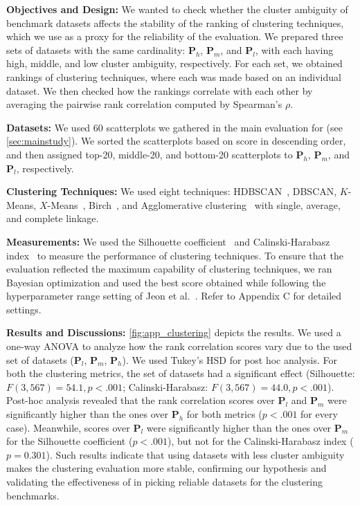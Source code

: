 \noindent
\textbf{Objectives and Design:}
We wanted to check whether the cluster ambiguity of benchmark datasets affects the stability of the ranking of clustering techniques, which we use as a proxy for the reliability of the evaluation. 
We prepared three sets of datasets with the same cardinality: $\mathbf{P}_h$, $\mathbf{P}_m$, and $\mathbf{P}_l$, with each having high, middle, and low cluster ambiguity, respectively. 
For each set, we obtained rankings of clustering techniques, where each was made based on an individual dataset. We then checked how the rankings correlate with each other by averaging the pairwise rank correlation computed by Spearman's $\rho$.

\noindent
\textbf{Datasets:}
We used 60 scatterplots we gathered in the main evaluation for \measure (see \autoref{sec:mainstudy}). We sorted the scatterplots based on \measure score in descending order, and then assigned top-20, middle-20, and bottom-20 scatterplots to $\mathbf{P}_h$, $\mathbf{P}_m$, and $\mathbf{P}_l$, respectively.  

\noindent
\textbf{Clustering Techniques:}
We used eight techniques: HDBSCAN~\cite{campello13kdd}, DBSCAN, $K$-Means, $X$-Means~\cite{pelleg00icml}, Birch~\cite{zhang96sigmod}, and Agglomerative clustering~\cite{mullner11arxiv} with single, average, and complete linkage.

\noindent
\textbf{Measurements:}
We used the Silhouette coefficient~\cite{rousseeuw87jcam} and Calinski-Harabasz index~\cite{calinski74cis} to measure the performance of clustering techniques. To ensure that the evaluation reflected the maximum capability of clustering techniques, we ran Bayesian optimization and used the best score obtained while following the hyperparameter range setting of Jeon et al.~\cite{jeon22arxiv}.
Refer to Appendix C for detailed settings.


\noindent
\textbf{Results and Discussions:}
\autoref{fig:app_clustering} depicts the results.
We used a one-way ANOVA to analyze how the rank correlation scores vary due to the used set of datasets ($\mathbf{P}_l$, $\mathbf{P}_m$, $\mathbf{P}_h$). We used Tukey's HSD for post hoc analysis. 
For both the clustering metrics, the set of datasets had a significant effect (Silhouette: $F(3,567)=54.1, p < .001$; Calinski-Harabasz: $F(3, 567)=44.0, p < .001$). Post-hoc analysis revealed that the rank correlation scores over $\mathbf{P}_l$ and $\mathbf{P}_m$ were significantly higher than the ones over $\mathbf{P}_h$ for both metrics ($p < .001$ for every case). Meanwhile, scores over $\mathbf{P}_l$ were significantly higher than the ones over $\mathbf{P}_m$ for the Silhouette coefficient ($p < .001$), but not for the Calinski-Harabasz index ($p=0.301$). Such results indicate that using datasets with less cluster ambiguity makes the clustering evaluation more stable, confirming our hypothesis and validating the effectiveness of \measure in picking reliable datasets for the clustering benchmarks.







